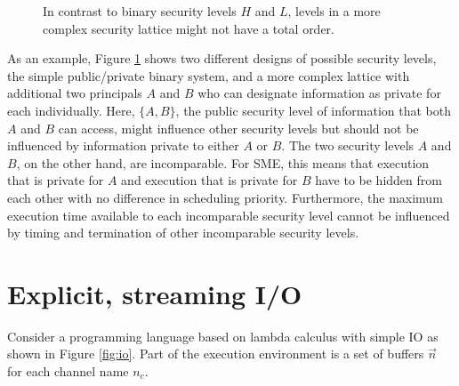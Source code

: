 \documentclass[10pt,preprint]{sigplanconf}
\begin{document}
\begin{figure}
\begin{center}\vspace{-2ex}
\end{center}
\caption{In contrast to binary security levels $H$ and $L$, levels in a more complex security lattice might not have a total order.  }
\label{fig:lattice}
\end{figure}

As an example, Figure \ref{fig:lattice} shows two different designs of possible security levels, the simple public/private binary system, and a more complex lattice with additional two principals $A$ and $B$ who can designate information as private for each individually.  Here, $\{ A,B \}$, the public security level of information that both $A$ and $B$ can access, might influence other security levels but should not be influenced by information private to either $A$ or $B$.  The two security levels $A$ and $B$, on the other hand, are incomparable.  For SME, this means that execution that is private for $A$ and execution that is private for $B$ have to be hidden from each other with no difference in scheduling priority.  Furthermore, the maximum execution time available to each incomparable security level cannot be influenced by timing and termination of other incomparable security levels.

\section{Explicit, streaming I/O}

Consider a programming language based on lambda calculus with simple IO as shown in Figure \ref{fig:io}.  Part of the execution environment is a set of buffers $\vec{n}$ for each channel name $n_c$.
\end{document}
